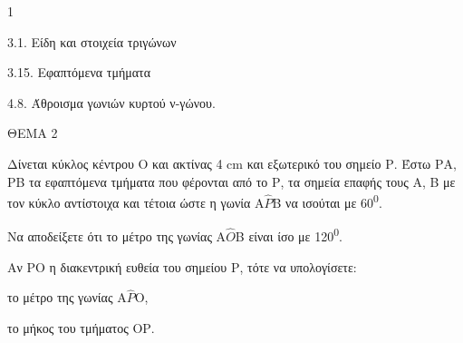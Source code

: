 \begin{ylh}{1}
    \item 3.1. Είδη και στοιχεία τριγώνων
    \item 3.15. Εφαπτόμενα τμήματα
    \item 4.8. Άθροισμα γωνιών κυρτού ν-γώνου.
\end{ylh}

ΘΕΜΑ 2

Δίνεται κύκλος κέντρου Ο και ακτίνας 4 cm και εξωτερικό του σημείο Ρ. Έστω ΡΑ, ΡΒ τα εφαπτόμενα τμήματα που φέρονται από το Ρ, τα σημεία επαφής τους A, B με τον κύκλο αντίστοιχα και τέτοια ώστε η γωνία Α$\widehat{Ρ}$Β να ισούται με 60\textsuperscript{0}.

\begin{alist}
\item Να αποδείξετε ότι το μέτρο της γωνίας Α$\widehat{Ο}$Β είναι ίσο με 120\textsuperscript{0}. 

\item Αν ΡΟ η διακεντρική ευθεία του σημείου Ρ, τότε να υπολογίσετε:

\begin{alist}
\item
  το μέτρο της γωνίας Α$\widehat{Ρ}$Ο, 
\item
  το μήκος του τμήματος ΟΡ. 


\begin{center}
\end{center}
\end{alist}
\end{alist}
